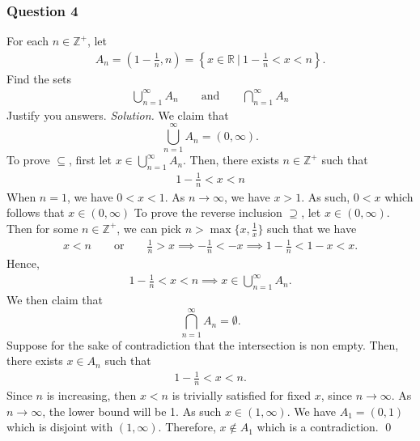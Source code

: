 \documentclass[12pt]{article}
\begin{document}
\subsubsection*{Question 4}
For each $n\in\mathbb{Z}^+$, let
\begin{align*}
    A_n=\left(1-\frac{1}{n},n\right)=\left\{x\in\mathbb{R}\ |\ 1-\frac{1}{n}<x<n\right\}.
\end{align*}
Find the sets
\begin{align*}
    \bigcup_{n=1}^\infty A_n\qquad\text{and}\qquad \bigcap_{n=1}^\infty A_n
\end{align*}
Justify you answers.
\newline
\newline\textit{Solution.} We claim that \[\displaystyle{\bigcup_{n=1}^\infty A_n}=(0,\infty).\]
To prove $\subseteq$, first let $x\in {\bigcup_{n=1}^\infty A_n}$. Then, there exists $n\in\mathbb{Z}^+$ such that 
\begin{align*}
    1-\frac{1}{n}<x<n
\end{align*}
When $n=1$, we have $0<x<1$. As $n\to\infty$, we have $x>1$. As such, $0<x$ which follows that $x\in (0,\infty)$
\newline
\newline To prove the reverse inclusion $\supseteq$, let $x\in (0,\infty)$. Then for some $n\in\mathbb{Z}^+$, we can pick $n>\operatorname{max}\{x,\frac{1}{x}\}$ such that we have
\begin{align*}
    x<n\qquad\text{or}\qquad \frac{1}{n}>x\implies -\frac{1}{n}<-x\implies1-\frac{1}{n}<1-x<x.
\end{align*}
Hence,
\begin{align*}
    1-\frac{1}{n}<x<n\implies x\in \displaystyle{\bigcup_{n=1}^\infty A_n}.
\end{align*}
We then claim that \[\displaystyle{\bigcap_{n=1}^\infty A_n=\emptyset}.\] Suppose for the sake of contradiction that the intersection is non empty. Then, there exists $x\in A_n$ such that
\begin{align*}
    1-\frac{1}{n}<x<n.
\end{align*}
Since $n$ is increasing, then $x<n$ is trivially satisfied for fixed $x$, since $n\to\infty$. As $n\to\infty$, the lower bound will be 1. As such $x\in (1,\infty)$. We have $A_1=(0,1)$ which is disjoint with $(1,\infty)$. Therefore, $x\notin A_1$ which is a contradiction. \qed
\end{document}
